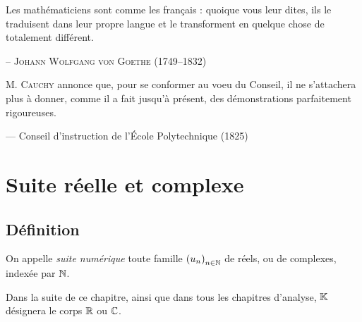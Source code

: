 \documentclass{magnoliaold}
\begin{document}
\setlength{}
\epigraph{\og Les mathématiciens sont comme les français : quoique vous leur dites, ils le traduisent dans leur propre langue et le transforment en quelque chose de totalement différent.\fg}{-- \textsc{Johann Wolfgang von Goethe (1749--1832)}}
\setlength{}
\epigraph{\og M. \textsc{Cauchy} annonce que, pour se conformer au voeu du Conseil, il ne s'attachera plus à donner, comme il a fait jusqu'à présent, des démonstrations parfaitement rigoureuses.\fg}{--- Conseil d'instruction de l'École Polytechnique (1825)}

\magtoc



\section{Suite réelle et complexe}
\subsection{Définition}

\begin{definition}[utile=-3]
On appelle \emph{suite numérique} toute famille $\left(u_n\right)_{n\in\mathbb{N}}$ de réels,
ou de complexes, indexée par $\mathbb{N}$.
\end{definition}

\begin{remarqueUnique}
\remarque Dans la suite de ce chapitre, ainsi que dans tous les chapitres d'analyse,
  $\mathbb{K}$ désignera le corps $\mathbb{R}$ ou $\mathbb{C}$.
\end{remarqueUnique}


\end{document}
